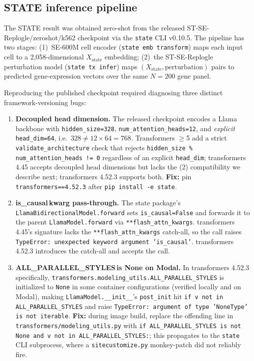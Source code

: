 \documentclass{article}
\begin{document}
\subsection{STATE inference pipeline}
\label{app:state_methods}

The STATE result was obtained zero-shot from the released ST-SE-Replogle/zeroshot/k562 checkpoint via the \texttt{state} CLI v0.10.5. The pipeline has two stages: (1)~SE-600M cell encoder (\texttt{state emb transform}) maps each input cell to a 2{,}058-dimensional $X_{\mathrm{state}}$ embedding; (2)~the ST-SE-Replogle perturbation model (\texttt{state tx infer}) maps $(X_{\mathrm{state}}, \mathrm{perturbation})$ pairs to predicted gene-expression vectors over the same $N{=}200$ gene panel.

Reproducing the published checkpoint required diagnosing three distinct framework-versioning bugs:
\begin{enumerate}[leftmargin=1.5em,topsep=2pt,itemsep=2pt]
    \item \textbf{Decoupled head dimension.} The released checkpoint encodes a Llama backbone with \texttt{hidden\_size=328}, \texttt{num\_attention\_heads=12}, and \emph{explicit} \texttt{head\_dim=64}, i.e.\ $328 \neq 12 \times 64 = 768$. Transformers $\geq$5 add a strict \texttt{validate\_architecture} check that rejects \texttt{hidden\_size \% num\_attention\_heads != 0} regardless of an explicit \texttt{head\_dim}; transformers 4.45 accepts decoupled head dimensions but lacks the (2) compatibility we describe next; transformers 4.52.3 supports both. \textbf{Fix:} pin \texttt{transformers==4.52.3} after \texttt{pip install -e state}.
    \item \textbf{is\_causal\,kwarg pass-through.} The state package's \texttt{LlamaBidirectionalModel.forward} sets \texttt{is\_causal=False} and forwards it to the parent \texttt{LlamaModel.forward} via \texttt{**flash\_attn\_kwargs}. transformers 4.45's signature lacks the \texttt{**flash\_attn\_kwargs} catch-all, so the call raises \texttt{TypeError: unexpected keyword argument 'is\_causal'}. transformers 4.52.3 introduces the catch-all and accepts the call.
    \item \textbf{ALL\_PARALLEL\_STYLES\,is None on Modal.} In transformers 4.52.3 specifically, \texttt{transformers.modeling\_utils.ALL\_PARALLEL\_STYLES} is initialized to \texttt{None} in some container configurations (verified locally and on Modal), making \texttt{LlamaModel.\_\_init\_\_}'s \texttt{post\_init} hit \texttt{if v not in ALL\_PARALLEL\_STYLES} and raise \texttt{TypeError: argument of type 'NoneType' is not iterable}. \textbf{Fix:} during image build, replace the offending line in \texttt{transformers/modeling\_utils.py} with \texttt{if ALL\_PARALLEL\_STYLES is not None and v not in ALL\_PARALLEL\_STYLES:}; this propagates to the \texttt{state} CLI subprocess, where a \texttt{sitecustomize.py} monkey-patch did not reliably fire.
\end{enumerate}
\end{document}
